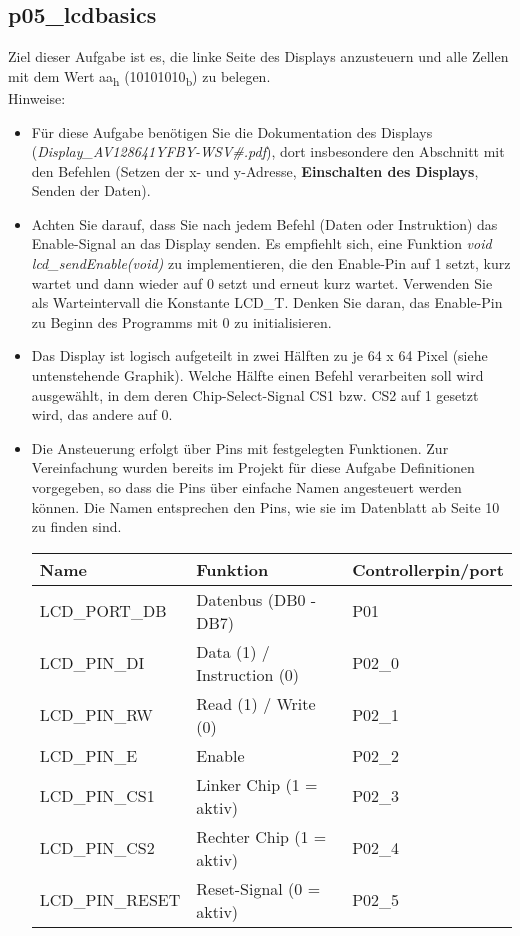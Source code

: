 \documentclass[
  accentcolor=tud1c,	%
  colorbacktitle,		%
  inverttitle,			%
  german,				%
  twoside
]{tudexercise}
\begin{document}
\subsection{p05\_lcdbasics}
Ziel dieser Aufgabe ist es, die linke Seite des Displays anzusteuern und alle Zellen mit dem Wert aa\textsubscript{h} (10101010\textsubscript{b}) zu belegen.\\
Hinweise:
\begin{itemize}
\item Für diese Aufgabe benötigen Sie die Dokumentation des Displays (\textit{Display\_AV128641YFBY-WSV\#.pdf}), dort insbesondere den Abschnitt mit den Befehlen (Setzen der x- und y-Adresse, \textbf{Einschalten des Displays}, Senden der Daten).
\item Achten Sie darauf, dass Sie nach jedem Befehl (Daten oder Instruktion) das Enable-Signal an das Display senden. Es empfiehlt sich, eine Funktion \textit{void lcd\_sendEnable(void)} zu implementieren, die den Enable-Pin auf 1 setzt, kurz wartet und dann wieder auf 0 setzt und erneut kurz wartet. Verwenden Sie als Warteintervall die Konstante LCD\_T. Denken Sie daran, das Enable-Pin zu Beginn des Programms mit 0 zu initialisieren.
\item Das Display ist logisch aufgeteilt in zwei Hälften zu je 64 x 64 Pixel (siehe untenstehende Graphik). Welche Hälfte einen Befehl verarbeiten soll wird ausgewählt, in dem deren Chip-Select-Signal CS1 bzw. CS2 auf 1 gesetzt wird, das andere auf 0.

\item Die Ansteuerung erfolgt über Pins mit festgelegten Funktionen. Zur Vereinfachung wurden bereits im Projekt für diese Aufgabe Definitionen vorgegeben, so dass die Pins über einfache Namen angesteuert werden können. Die Namen entsprechen den Pins, wie sie im Datenblatt ab Seite 10 zu finden sind.

\begin{center}
\begin{tabular}{l|l|l}
Name & Funktion & Controllerpin/port \\ 
\hline 
LCD\_PORT\_DB & Datenbus (DB0 - DB7) & P01 \\ 
LCD\_PIN\_DI & Data (1) / Instruction (0) & P02\_0 \\ 
LCD\_PIN\_RW & Read (1) / Write (0) & P02\_1 \\ 
LCD\_PIN\_E & Enable & P02\_2 \\ 
LCD\_PIN\_CS1 & Linker Chip (1 = aktiv) & P02\_3 \\ 
LCD\_PIN\_CS2 & Rechter Chip (1 = aktiv) & P02\_4 \\ 
LCD\_PIN\_RESET & Reset-Signal (0 = aktiv) & P02\_5 \\ 
\end{tabular}
\end{center}


\end{itemize}
\end{document}
